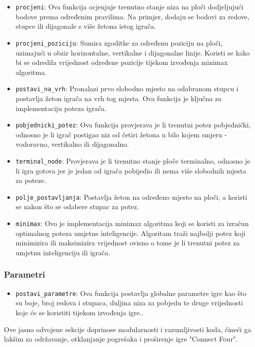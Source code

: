 \documentclass[]{foi}
\begin{document}
\begin{itemize}
    \item \texttt{procjeni}: Ova funkcija ocjenjuje trenutno stanje niza na ploči dodjeljujući bodove prema određenim pravilima. Na primjer, dodaju se bodovi za redove, stupce ili dijagonale s više žetona istog igrača.
    \item \texttt{procjeni\_poziciju}: Sumira zgoditke za određenu poziciju na ploči, uzimajući u obzir horizontalne, vertikalne i dijagonalne linije. Koristi se kako bi se odredila vrijednost određene pozicije tijekom izvođenja minimax algoritma.
    \item \texttt{postavi\_na\_vrh}: Pronalazi prvo slobodno mjesto na odabranom stupcu i postavlja žeton igrača na vrh tog mjesta. Ova funkcija je ključna za implementaciju poteza igrača.
    \item \texttt{pobjednicki\_potez}: Ova funkcija provjerava je li trenutni potez pobjednički, odnosno je li igrač postigao niz od četiri žetona u bilo kojem smjeru - vodoravno, vertikalno ili dijagonalno.
    \item \texttt{terminal\_node}:  Provjerava je li trenutno stanje ploče terminalno, odnosno je li igra gotova jer je jedan od igrača pobijedio ili nema više slobodnih mjesta za poteze.
    \item \texttt{polje\_postavljanja}: Postavlja žeton na određeno mjesto na ploči, a koristi se nakon što se odabere stupac za potez.
    \item \texttt{minimax}: Ovo je implementacija minimax algoritma koji se koristi za izračun optimalnog poteza umjetne inteligencije. Algoritam traži najbolji potez koji minimizira ili maksimizira vrijednost ovisno o tome je li trenutni potez za umjetnu inteligenciju ili igrača.
\end{itemize}

\subsubsection{Parametri}
\begin{itemize}
    \item \texttt{postavi\_parametre}: Ova funkcija postavlja globalne parametre igre kao što su boje, broj redova i stupaca, duljina niza za pobjedu te druge vrijednosti koje će se koristiti tijekom izvođenja igre..
\end{itemize}
Ove jasno odvojene sekcije doprinose modularnosti i razumljivosti koda, čineći ga lakšim za održavanje, otklanjanje pogrešaka i proširenje igre "Connect Four".
\end{document}
